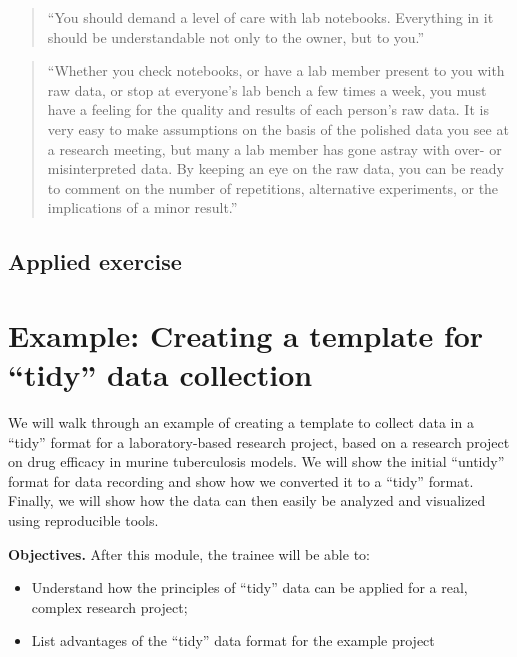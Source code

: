 \documentclass[]{tufte-book}
\providecommand{\tightlist}{%
  \setlength{\itemsep}{0pt}\setlength{\parskip}{0pt}}
\begin{document}
\begin{quote}
``You should demand a level of care with lab notebooks. Everything in it should
be understandable not only to the owner, but to you.'' \citep{leips2010helm}
\end{quote}

\begin{quote}
``Whether you check notebooks, or have a lab member present to you with
raw data, or stop at everyone's lab bench a few times a week, you must
have a feeling for the quality and results of each person's raw data. It is
very easy to make assumptions on the basis of the polished data you
see at a research meeting, but many a lab member has gone astray with over-
or misinterpreted data. By keeping an eye on the raw data, you can be
ready to comment on the number of repetitions, alternative experiments,
or the implications of a minor result.'' \citep{leips2010helm}
\end{quote}

\hypertarget{applied-exercise-1}{%
\subsection{Applied exercise}\label{applied-exercise-1}}

\hypertarget{module5}{%
\section{Example: Creating a template for ``tidy'' data collection}\label{module5}}

We will walk through an example of creating a template to collect data in a
``tidy'' format for a laboratory-based research project, based on a research
project on drug efficacy in murine tuberculosis models. We will show the initial
``untidy'' format for data recording and show how we converted it to a ``tidy''
format. Finally, we will show how the data can then easily be analyzed and
visualized using reproducible tools.

\textbf{Objectives.} After this module, the trainee will be able to:

\begin{itemize}
\tightlist
\item
  Understand how the principles of ``tidy'' data can be applied for a real, complex research project;
\item
  List advantages of the ``tidy'' data format for the example project
\end{itemize}
\end{document}

